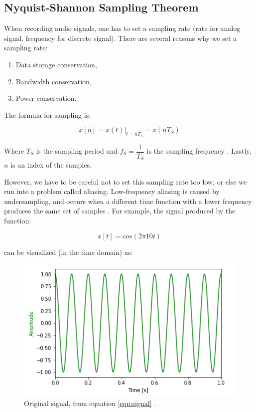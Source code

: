 \subsection{Nyquist-Shannon Sampling Theorem}

When recording audio signals, one has to set a sampling rate
(rate for analog signal, frequency for discrete signal). There
are several reasons why we set a sampling rate:

\begin{enumerate}
	\item Data storage conservation,
	\item Bandwidth conservation,
	\item Power conservation.
\end{enumerate}

The formula for sampling is:

\begin{equation}
	x[n]=x(t)|_{t=nT_{S}}=x(nT_{S})
	\label{eqn:signal}
\end{equation}

Where \(T_{S}\) is the sampling period and \(f_{S}=
\dfrac{1}{T_{S}}\) is the sampling frequency 
\cite{notes:class}. Lastly, $n$ is an index of the samples.

However, we have to be careful not to set this sampling rate too
low, or else we run into a problem called aliasing. Low-frequency
aliasing is caused by undersampling, and occurs when a different
time function with a lower frequency produces the same set of
samples \cite{aliase:wiki}. For example, the signal produced by
the function:

\begin{equation}
	x[t]=cos(2\pi10t)
\end{equation}

can be visualized (in the time domain) as:

\begin{figure}[H]
	\centering
	\includegraphics[scale = 1]{images/original_signal.png} %
	\caption{Original signal, from equation \ref{eqn:signal} \cite{notebook:sampling}.}
	\label{fig:signal_og}
\end{figure}    

